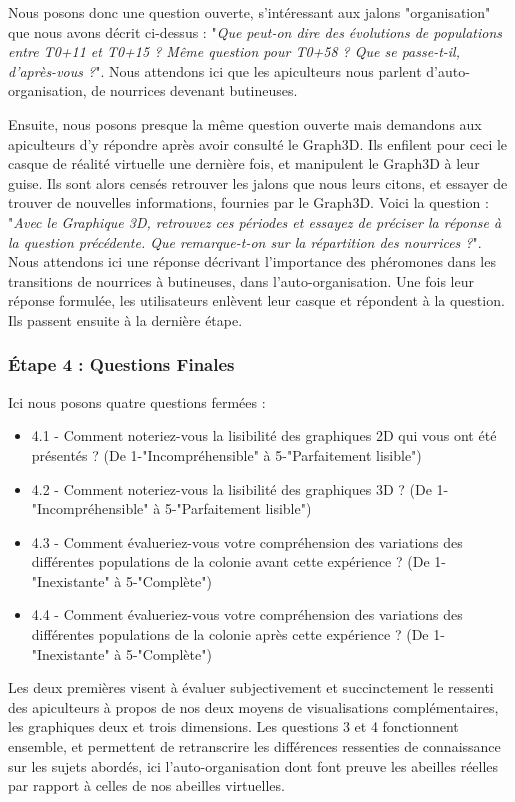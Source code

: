 			Nous posons donc une question ouverte, s'intéressant aux jalons "organisation" que nous avons décrit ci-dessus : "\textit{Que peut-on dire des évolutions de populations entre T0+11 et T0+15 ? Même question pour T0+58 ? Que se passe-t-il, d'après-vous ?}". Nous attendons ici que les apiculteurs nous parlent d'auto-organisation, de nourrices devenant butineuses.
			
			Ensuite, nous posons presque la même question ouverte mais demandons aux apiculteurs d'y répondre après avoir consulté le Graph3D. Ils enfilent pour ceci le casque de réalité virtuelle une dernière fois, et manipulent le Graph3D à leur guise. Ils sont alors censés retrouver les jalons que nous leurs citons, et essayer de trouver de nouvelles informations, fournies par le Graph3D. Voici la question : "\textit{Avec le Graphique 3D, retrouvez ces périodes et essayez de préciser la réponse à la question précédente. Que remarque-t-on sur la répartition des nourrices ?}". Nous attendons ici une réponse décrivant l'importance des phéromones dans les transitions de nourrices à butineuses, dans l'auto-organisation. Une fois leur réponse formulée, les utilisateurs enlèvent leur casque et répondent à la question. Ils passent ensuite à la dernière étape.
			
			\subsubsection{Étape 4 : Questions Finales}
			Ici nous posons quatre questions fermées :
			\begin{itemize}
				\item 4.1 - Comment noteriez-vous la lisibilité des graphiques 2D qui vous ont été présentés ? (De 1-"Incompréhensible" à 5-"Parfaitement lisible")
				\item 4.2 - Comment noteriez-vous la lisibilité des graphiques 3D ? (De 1-"Incompréhensible" à 5-"Parfaitement lisible")
				\item 4.3 - Comment évalueriez-vous votre compréhension des variations des différentes populations de la colonie avant cette expérience ? (De 1-"Inexistante" à 5-"Complète")
				\item 4.4 - Comment évalueriez-vous votre compréhension des variations des différentes populations de la colonie après cette expérience ? (De 1-"Inexistante" à 5-"Complète")
			\end{itemize}
			
			Les deux premières visent à évaluer subjectivement et succinctement le ressenti des apiculteurs à propos de nos deux moyens de visualisations complémentaires, les graphiques deux et trois dimensions.
			Les questions 3 et 4 fonctionnent ensemble, et permettent de retranscrire les différences ressenties de connaissance sur les sujets abordés, ici l'auto-organisation dont font preuve les abeilles réelles par rapport à celles de nos abeilles virtuelles.
		
